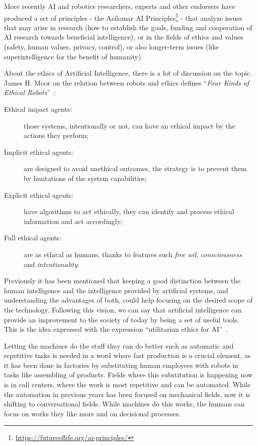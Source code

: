 More recently AI and robotics researchers, experts and other endorsers have produced a set of principles - the Asilomar AI Principles\footnote{\url{https://futureoflife.org/ai-principles/}} - that analyze issues that may arise in research (how to establish the goals, funding and cooperation of AI research towards beneficial intelligence), or in the fields of ethics and values (safety, human values, privacy, control), or also longer-term issues (like superintelligence for the benefit of humanity).

About the ethics of Artificial Intelligence, there is a lot of discussion on the topic. James H. Moor on the relation between robots and ethics defines ``\textit{Four Kinds of Ethical Robots}''~\cite{moor2009four}:

\begin{description}
	\item[Ethical impact agents:] those systems, intentionally or not, can have an ethical impact by the actions they perform;
	\item[Implicit ethical agents:] are designed to avoid unethical outcomes, the strategy is to prevent them by limitations of the system capabilities;
	\item[Explicit ethical agents:] have algorithms to act ethically, they can identify and process ethical information and act accordingly;
	\item[Full ethical agents:] are as ethical as humans, thanks to features such \textit{free wil}, \textit{consciousness} and \textit{intentionality}.
\end{description}

Previously it has been mentioned that keeping a good distinction between the human intelligence and the intelligence provided by artificial systems, and understanding the advantages of both, could help focusing on the desired scope of the technology. Following this vision, we can say that artificial intelligence can provide an improvement to the society of today by being a set of useful tools. This is the idea expressed with the expression ``utilitarian ethics for AI''~\cite{hibbard2014ethical}.

Letting the machines do the stuff they can do better such as automatic and repetitive tasks is needed in a word where fast production is a crucial element, as it has been done in factories by substituting human employees with robots in tasks like assembling of products. Fields where this substitution is happening now is in call centers, where the work is most repetitive and can be automated. While the automation in previous years has been focused on mechanical fields, now it is shifting to conversational fields. While machines do this works, the humans can focus on works they like more and on decisional processes.

